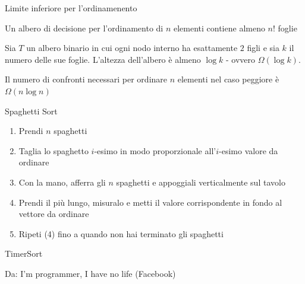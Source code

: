 \begin{frame}{Limite inferiore per l'ordinamenento}

\vspace{-9pt}
\begin{myboxtitle}[Lemma 1]
Un albero di decisione per l'ordinamento di $n$ elementi contiene almeno $n!$ foglie
\end{myboxtitle}

\begin{myboxtitle}[Lemma 2]
Sia $T$ un albero binario in cui ogni nodo interno ha esattamente $2$ figli e sia $k$ il numero delle sue foglie. 
L'altezza dell'albero è almeno $\log k$ - ovvero $\Omega(\log k)$.
\end{myboxtitle}

\begin{myboxtitle}[Teorema]
Il numero di confronti necessari per ordinare $n$ elementi nel caso peggiore è $\Omega(n \log n)$
\end{myboxtitle}

\end{frame}


\begin{frame}{Spaghetti Sort}

\vspace{-9pt}
\begin{myboxtitle}
\begin{enumerate}
\item Prendi $n$ spaghetti
\item Taglia lo spaghetto $i$-esimo in modo proporzionale all'$i$-esimo valore da ordinare
\item Con la mano, afferra gli $n$ spaghetti e appoggiali verticalmente sul tavolo
\item Prendi il più lungo, misuralo e metti il valore corrispondente in fondo al vettore da ordinare
\item Ripeti (4) fino a quando non hai terminato gli spaghetti
\end{enumerate}
\end{myboxtitle}
\end{frame}

\begin{frame}{TimerSort}


\bigskip
Da: I'm programmer, I have no life (Facebook)

\end{frame}



